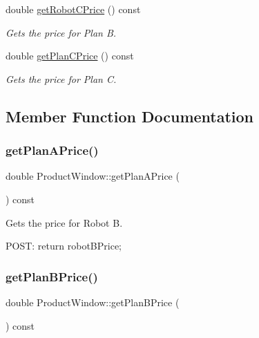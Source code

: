 \begin{DoxyCompactItemize}
double \mbox{\hyperlink{class_product_window_a66832cd0d36260949da84db6afa21a92}{get\+Robot\+C\+Price}} () const
\begin{DoxyCompactList}\small\item\em Gets the price for Plan B. \end{DoxyCompactList}\item 
double \mbox{\hyperlink{class_product_window_a6236c105e5feffeb6bc778ea7f936939}{get\+Plan\+C\+Price}} () const
\begin{DoxyCompactList}\small\item\em Gets the price for Plan C. \end{DoxyCompactList}\end{DoxyCompactItemize}


\subsection{Member Function Documentation}
\mbox{\label{class_product_window_afdeb02aa3514967090ef6d70b5407e0b}} 
\subsubsection{\texorpdfstring{getPlanAPrice()}{getPlanAPrice()}}
{\footnotesize\ttfamily double Product\+Window\+::get\+Plan\+A\+Price (\begin{DoxyParamCaption}{ }\end{DoxyParamCaption}) const}



Gets the price for Robot B. 

P\+O\+ST\+: return robot\+B\+Price; \mbox{\label{class_product_window_a689a1bac6a244deffa68721fd8010835}} 
\subsubsection{\texorpdfstring{getPlanBPrice()}{getPlanBPrice()}}
{\footnotesize\ttfamily double Product\+Window\+::get\+Plan\+B\+Price (\begin{DoxyParamCaption}{ }\end{DoxyParamCaption}) const}



